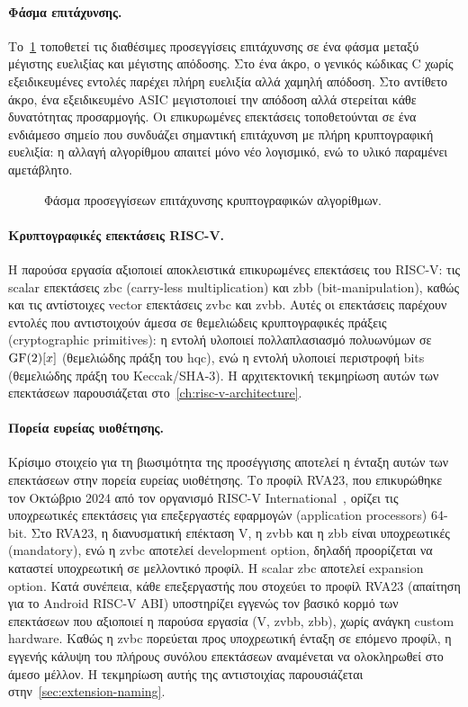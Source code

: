 \paragraph{Φάσμα επιτάχυνσης.}
Το~\cref{fig:acceleration-spectrum} τοποθετεί τις διαθέσιμες προσεγγίσεις
επιτάχυνσης σε ένα φάσμα μεταξύ μέγιστης ευελιξίας και μέγιστης απόδοσης.
Στο ένα άκρο, ο γενικός κώδικας C χωρίς εξειδικευμένες εντολές παρέχει πλήρη
ευελιξία αλλά χαμηλή απόδοση. Στο αντίθετο άκρο, ένα εξειδικευμένο ASIC
μεγιστοποιεί την απόδοση αλλά στερείται κάθε δυνατότητας προσαρμογής. Οι
επικυρωμένες επεκτάσεις τοποθετούνται σε ένα ενδιάμεσο σημείο που
συνδυάζει σημαντική επιτάχυνση με πλήρη κρυπτογραφική ευελιξία: η αλλαγή
αλγορίθμου απαιτεί μόνο νέο λογισμικό, ενώ το υλικό παραμένει αμετάβλητο.

\begin{figure}[htbp]
  \centering
  
  \caption{Φάσμα προσεγγίσεων επιτάχυνσης κρυπτογραφικών αλγορίθμων.}
  \label{fig:acceleration-spectrum}
\end{figure}

\paragraph{Κρυπτογραφικές επεκτάσεις RISC-V.}
Η παρούσα εργασία αξιοποιεί αποκλειστικά επικυρωμένες επεκτάσεις
του RISC-V: τις scalar επεκτάσεις \gls{zbc} (carry-less multiplication) και \gls{zbb}
(bit-manipulation), καθώς και τις αντίστοιχες vector επεκτάσεις \gls{zvbc} και
\gls{zvbb}. Αυτές οι επεκτάσεις παρέχουν εντολές που αντιστοιχούν άμεσα σε θεμελιώδεις
κρυπτογραφικές πράξεις (cryptographic primitives): η εντολή \clmul υλοποιεί πολλαπλασιασμό πολυωνύμων
σε $\mathrm{GF}(2)[x]$ (θεμελιώδης πράξη του \gls{hqc}), ενώ η εντολή \vror υλοποιεί
περιστροφή bits (θεμελιώδης πράξη του Keccak/SHA-3). Η αρχιτεκτονική
τεκμηρίωση αυτών των επεκτάσεων παρουσιάζεται
στο~\cref{ch:risc-v-architecture}.

\paragraph{Πορεία ευρείας υιοθέτησης.}
Κρίσιμο στοιχείο για τη βιωσιμότητα της προσέγγισης αποτελεί η ένταξη αυτών
των επεκτάσεων στην πορεία ευρείας υιοθέτησης. Το προφίλ RVA23, που
επικυρώθηκε τον Οκτώβριο 2024 από τον οργανισμό RISC-V
International~\cite{RVA23-profile}, ορίζει τις υποχρεωτικές επεκτάσεις για
επεξεργαστές εφαρμογών (application processors) 64-bit. Στο RVA23, η διανυσματική επέκταση V, η \gls{zvbb}
και η \gls{zbb} είναι υποχρεωτικές (mandatory), ενώ η \gls{zvbc} αποτελεί development
option, δηλαδή προορίζεται να καταστεί υποχρεωτική σε μελλοντικό προφίλ. Η
scalar \gls{zbc} αποτελεί expansion option. Κατά συνέπεια, κάθε επεξεργαστής που στοχεύει το προφίλ RVA23 (απαίτηση για το
Android RISC-V ABI) υποστηρίζει εγγενώς τον βασικό κορμό των επεκτάσεων που
αξιοποιεί η παρούσα εργασία (V, \gls{zvbb}, \gls{zbb}), χωρίς ανάγκη
custom hardware. Καθώς η \gls{zvbc} πορεύεται προς υποχρεωτική ένταξη σε
επόμενο προφίλ, η εγγενής κάλυψη του πλήρους συνόλου επεκτάσεων αναμένεται να
ολοκληρωθεί στο άμεσο μέλλον. Η τεκμηρίωση αυτής της αντιστοιχίας
παρουσιάζεται στην~\cref{sec:extension-naming}.

